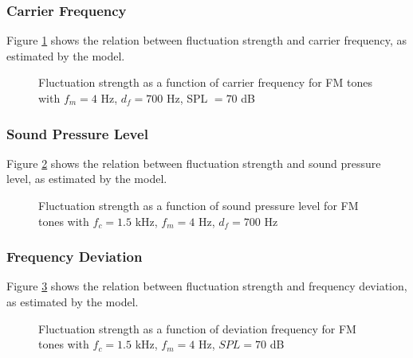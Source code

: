 \documentclass[a4paper]{article}
\begin{document}
\subsubsection{Carrier Frequency}

Figure \ref{fig:FMtonesfcplot} shows the relation between fluctuation strength
and carrier frequency, as estimated by the model.

\begin{figure}[ht]
    \centering
    \resizebox{!}{8cm}{
        
    }
    \caption{Fluctuation strength as a function of carrier frequency for FM
        tones with $f_m = 4$ Hz, $d_f = 700$ Hz, SPL $= 70$ dB}
    \label{fig:FMtonesfcplot}
\end{figure}

\subsubsection{Sound Pressure Level}

Figure \ref{fig:FMtonesSPLplot} shows the relation between fluctuation strength
and sound pressure level, as estimated by the model.

\begin{figure}[ht]
    \centering
    \resizebox{!}{8cm}{
        
    }
    \caption{Fluctuation strength as a function of sound pressure level for FM
        tones with $f_c = 1.5$ kHz, $f_m = 4$ Hz, $d_f = 700$ Hz}
    \label{fig:FMtonesSPLplot}
\end{figure}

\subsubsection{Frequency Deviation}

Figure \ref{fig:FMtonesdfplot} shows the relation between fluctuation strength
and frequency deviation, as estimated by the model.

\begin{figure}[ht]
    \centering
    \resizebox{!}{8cm}{
        
    }
    \caption{Fluctuation strength as a function of deviation frequency for FM
        tones with $f_c = 1.5$ kHz, $f_m = 4$ Hz, $SPL = 70$ dB}
    \label{fig:FMtonesdfplot}
\end{figure}
\end{document}

